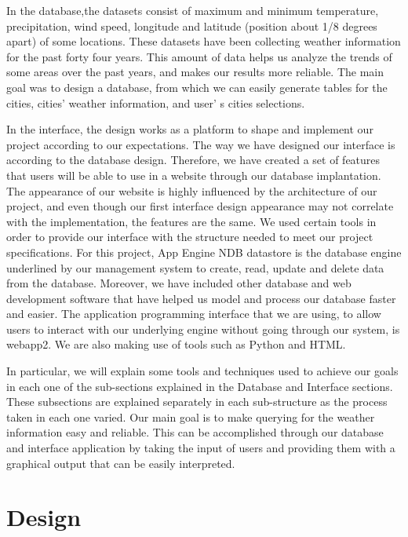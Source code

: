 \documentclass{sig-alternate}
\begin{document}
	In the database,the datasets consist of maximum and minimum temperature, precipitation, wind speed, 		longitude and latitude (position about 1/8 degrees apart) of some locations. These datasets have 			been collecting weather information for the past forty four years. This amount of data helps us 			analyze the trends of some areas over the past years, and makes our results more reliable. The main 		goal was to design a database, from which we can easily generate tables for the cities, cities' 			weather 	information, and user' s cities selections.\newline
    
	In the interface, the design works as a platform to shape and implement our project according to our 	expectations. The way we have designed our interface is according to the database design. Therefore, 	we have created a set of features that users will be able to use in a website through our database 		implantation. The appearance of our website is highly influenced by the architecture of our project, 	and even though our first interface design appearance may not correlate with the implementation, the 	features are the same. We used certain tools in order to provide our interface with the structure 		needed to meet our project specifications. For this project, App Engine NDB datastore is the 				database engine 	underlined by our management system to create, read, update and delete data from the 	database. Moreover, we have included other database and web development software that have helped us 	model and process our database faster and easier. The application programming interface that we are 		using, to allow users to interact with our underlying engine without going through our system, is 		webapp2. We are also making use of tools such as Python and HTML. \newline

	In particular, we will explain some tools and techniques used to achieve our goals in each one of 		the sub-sections explained in the Database and Interface sections. These subsections are explained 		separately in each sub-structure as the process taken in each one varied. Our main goal is to make 		querying for the weather information easy and reliable. This can be accomplished through our 				database and interface application by taking the input of users and providing them with a graphical 		output that can be easily interpreted.\newline

\section{Design}
	\label{Design}
\end{document}

